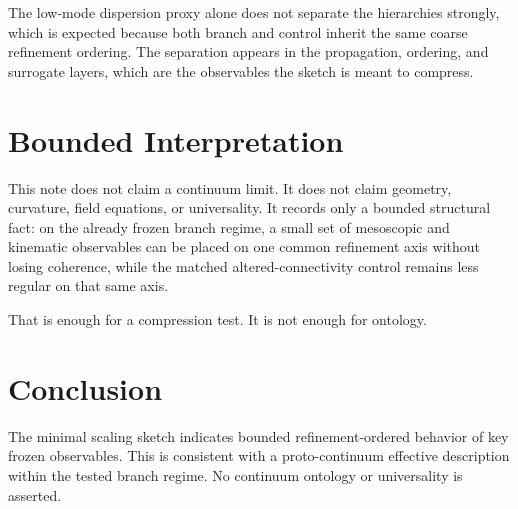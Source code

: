\documentclass[11pt]{article}
\begin{document}
The low-mode dispersion proxy alone does not separate the hierarchies strongly, which is expected because both branch and control inherit the same coarse refinement ordering. The separation appears in the propagation, ordering, and surrogate layers, which are the observables the sketch is meant to compress.

\section{Bounded Interpretation}

This note does not claim a continuum limit. It does not claim geometry, curvature, field equations, or universality. It records only a bounded structural fact: on the already frozen branch regime, a small set of mesoscopic and kinematic observables can be placed on one common refinement axis without losing coherence, while the matched altered-connectivity control remains less regular on that same axis.

That is enough for a compression test. It is not enough for ontology.

\section{Conclusion}

The minimal scaling sketch indicates bounded refinement-ordered behavior of key frozen observables. This is consistent with a proto-continuum effective description within the tested branch regime. No continuum ontology or universality is asserted.
\end{document}
